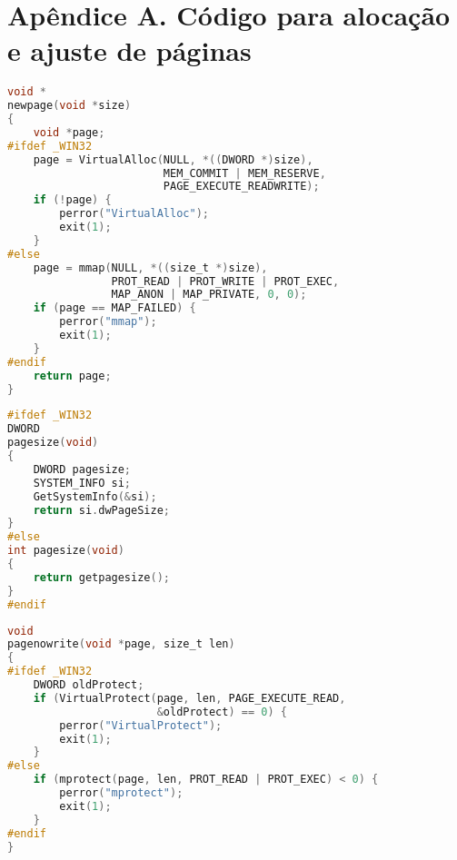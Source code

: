 \chapter*{Apêndice A. Código para alocação e ajuste de páginas}
\label{apendiceA}


\renewcommand\lstlistingname{Código}

\begin{lstlisting}[language=C, caption={Alocação de página(s) para o
    compilador JIT}, frame=tb]
void *
newpage(void *size)
{
    void *page;
#ifdef _WIN32
    page = VirtualAlloc(NULL, *((DWORD *)size),
                        MEM_COMMIT | MEM_RESERVE,
                        PAGE_EXECUTE_READWRITE);
    if (!page) {
        perror("VirtualAlloc");
        exit(1);
    }
#else
    page = mmap(NULL, *((size_t *)size),
                PROT_READ | PROT_WRITE | PROT_EXEC,
                MAP_ANON | MAP_PRIVATE, 0, 0);
    if (page == MAP_FAILED) {
        perror("mmap");
        exit(1);
    }
#endif
    return page;
}
\end{lstlisting}

\begin{lstlisting}[language=C, caption={Tamanho, em bytes, de uma
    página}, frame=tb]
#ifdef _WIN32
DWORD
pagesize(void)
{
    DWORD pagesize;
    SYSTEM_INFO si;
    GetSystemInfo(&si);
    return si.dwPageSize;
}
#else
int pagesize(void)
{
    return getpagesize();
}
#endif
\end{lstlisting}


\begin{lstlisting}[language=C, caption={Remoção da permissão de
    escrita de uma ou mais páginas}, frame=tb]
void
pagenowrite(void *page, size_t len)
{
#ifdef _WIN32
    DWORD oldProtect;
    if (VirtualProtect(page, len, PAGE_EXECUTE_READ,
                       &oldProtect) == 0) {
        perror("VirtualProtect");
        exit(1);
    }
#else
    if (mprotect(page, len, PROT_READ | PROT_EXEC) < 0) {
        perror("mprotect");
        exit(1);
    }
#endif
}
\end{lstlisting}


% 
% 
% 
% 
% 
% 
% 
% 
% 
% 
% 

